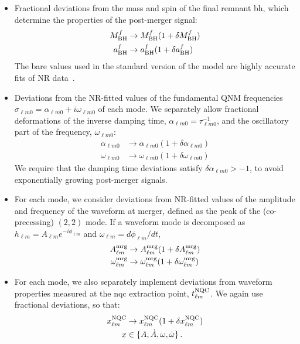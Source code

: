 \documentclass[prd,amssymb,amsmath,amsfonts,nofootinbib,reprint,showpacs,longbibliography]{revtex4-1}
\def\mbhf{M_{\rm BH}^f}
\def\abhf{a_{\rm BH}^f}
\def\alphalm0{\alpha_{\ell m 0}}
\def\omegalm0{\omega_{\ell m 0}}
\begin{document}
\begin{itemize}
\item Fractional deviations from the mass and spin of the final remnant \ac{bh}, which determine the properties
of the post-merger signal:
\begin{subequations}
\begin{align}
\mbhf &\rightarrow \mbhf (1 + \delta \mbhf) \\
\abhf &\rightarrow \abhf (1 + \delta \abhf)
\end{align}
\end{subequations}
The bare values used in the standard version of the model are highly accurate fits of NR data~\cite{paper}.
%
\item Deviations from the NR-fitted values of the fundamental QNM frequencies $\sigma_{\ell m 0} = \alphalm0
 + i \omegalm0$ of each mode. We separately allow fractional deformations of the inverse damping time,
 $\alphalm0 = \tau_{\ell m 0}^{-1}$, and the oscillatory part of the frequency, $\omegalm0$:
\begin{subequations}
\begin{align}
\alphalm0 &\rightarrow \alphalm0 (1 + \delta \alphalm0) \\
\omegalm0 &\rightarrow \omegalm0 (1 + \delta \omegalm0)
\end{align}
\end{subequations}
We require that the damping time deviations satisfy $\delta \alphalm0 > -1$, to avoid exponentially growing
post-merger signals.
%
\item For each mode, we consider deviations from NR-fitted values of the amplitude and frequency of the
waveform at merger, defined as the peak of the (co-precessing) $(2,2)$ mode. If a waveform mode is decomposed
as $h_{\ell m} = A_{\ell m} e^{-i \phi_{\ell m}}$ and $\omega_{\ell m} = d\phi_{\ell m}/dt$,
\begin{subequations}
\begin{align}
A_{\ell m}^{\rm mrg} &\rightarrow A_{\ell m}^{\rm mrg} (1 + \delta A_{\ell m}^{\rm mrg}) \\
\omega_{\ell m}^{\rm mrg} &\rightarrow \omega_{\ell m}^{\rm mrg} (1 + \delta \omega_{\ell m}^{\rm mrg})
\end{align}
\end{subequations}
%
\item For each mode, we also separately implement deviations from waveform properties measured at the \ac{nqc}
extraction point, $t_{\ell m}^{\rm NQC}$. We again use fractional deviations, so that:
\begin{subequations}
\begin{align}
x_{\ell m}^{\rm NQC} &\rightarrow x_{\ell m}^{\rm NQC} (1 + \delta x_{\ell m}^{\rm NQC}) \\
x &\in \{A, \dot{A}, \omega, \dot{\omega}\} \, .
\end{align}
\end{subequations}
\end{itemize}
\end{document}

